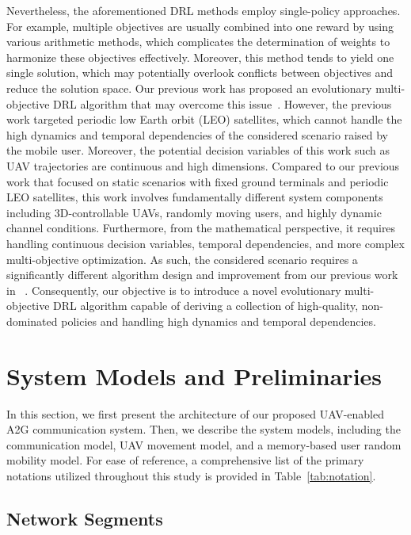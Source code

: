 \documentclass[10pt,journal,compsoc]{IEEEtran}
\begin{document}
\par Nevertheless, the aforementioned DRL methods employ single-policy approaches. For example, multiple objectives are usually combined into one reward by using various arithmetic methods, which complicates the determination of weights to harmonize these objectives effectively. Moreover, this method tends to yield one single solution, which may potentially overlook conflicts between objectives and reduce the solution space. Our previous work has proposed an evolutionary multi-objective DRL algorithm that may overcome this issue~\cite{10679228}. However, the previous work targeted periodic low Earth orbit (LEO) satellites, which cannot handle the high dynamics and temporal dependencies of the considered scenario raised by the mobile user. Moreover, the potential decision variables of this work such as UAV trajectories are continuous and high dimensions. Compared to our previous work that focused on static scenarios with fixed ground terminals and periodic LEO satellites, this work involves fundamentally different system components including 3D-controllable UAVs, randomly moving users, and highly dynamic channel conditions. Furthermore, from the mathematical perspective, it requires handling continuous decision variables, temporal dependencies, and more complex multi-objective optimization. As such, the considered scenario requires a significantly different algorithm design and improvement from our previous work in ~\cite{10679228}. Consequently, our objective is to introduce a novel evolutionary multi-objective DRL algorithm capable of deriving a collection of high-quality, non-dominated policies and handling high dynamics and temporal dependencies.


%
%
\section{System Models and Preliminaries}
\label{sec:Models and Preliminaries}

\par In this section, we first present the architecture of our proposed UAV-enabled A2G communication system. Then, we describe the system models, including the communication model, UAV movement model, and a memory-based user random mobility model. For ease of reference, a comprehensive list of the primary notations utilized throughout this study is provided in Table~\ref{tab:notation}.


%
%
\subsection{Network Segments}
\label{subsec:Network Segments}
\end{document}
